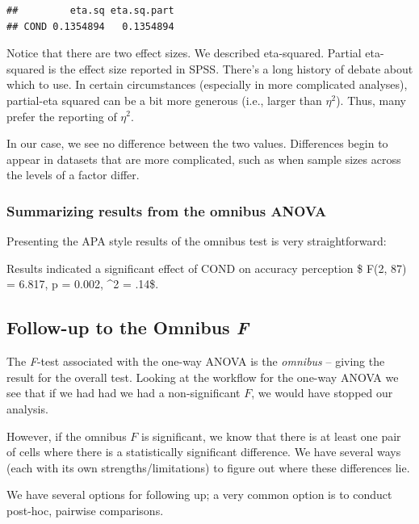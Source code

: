 \documentclass[
  english,
]{book}
\begin{document}
\begin{verbatim}
##         eta.sq eta.sq.part
## COND 0.1354894   0.1354894
\end{verbatim}

Notice that there are two effect sizes. We described eta-squared. Partial eta-squared is the effect size reported in SPSS. There's a long history of debate about which to use. In certain circumstances (especially in more complicated analyses), partial-eta squared can be a bit more generous (i.e., larger than \(\eta^2\)). Thus, many prefer the reporting of \(\eta^2\).

In our case, we see no difference between the two values. Differences begin to appear in datasets that are more complicated, such as when sample sizes across the levels of a factor differ.

\hypertarget{summarizing-results-from-the-omnibus-anova}{%
\subsubsection{Summarizing results from the omnibus ANOVA}\label{summarizing-results-from-the-omnibus-anova}}

Presenting the APA style results of the omnibus test is very straightforward:

Results indicated a significant effect of COND on accuracy perception \$ F(2, 87) = 6.817, p = 0.002, \eta\^{}2 = .14\$.

\hypertarget{follow-up-to-the-omnibus-f}{%
\subsection{\texorpdfstring{Follow-up to the Omnibus \emph{F}}{Follow-up to the Omnibus F}}\label{follow-up-to-the-omnibus-f}}

The \emph{F}-test associated with the one-way ANOVA is the \emph{omnibus} -- giving the result for the overall test. Looking at the workflow for the one-way ANOVA we see that if we had had we had a non-significant \(F\), we would have stopped our analysis.

However, if the omnibus \(F\) is significant, we know that there is at least one pair of cells where there is a statistically significant difference. We have several ways (each with its own strengths/limitations) to figure out where these differences lie.

We have several options for following up; a very common option is to conduct post-hoc, pairwise comparisons.
\end{document}
